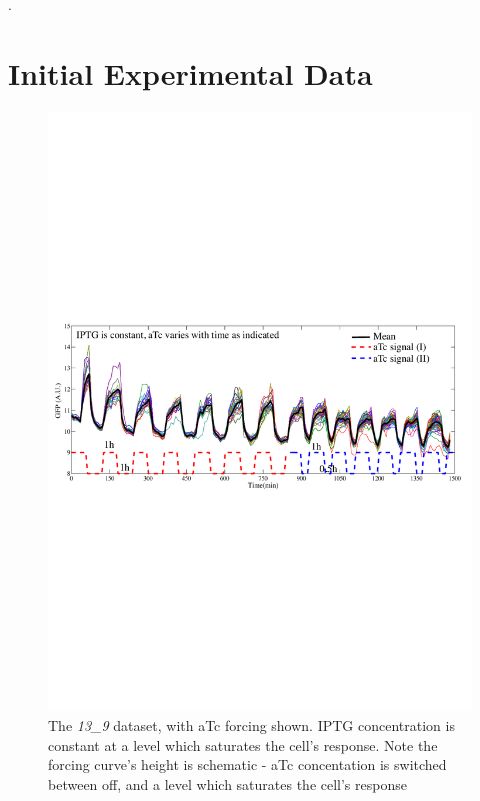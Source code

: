 \documentclass[10pt,journal]{./IEEE_latex_class/IEEEtran}
\begin{document}
.





\clearpage
\onecolumn

\appendices
\renewcommand\thefigure{\thesection.\arabic{figure}}  


\section{Initial Experimental Data}
\label{Initial Experimental Data}
\setcounter{figure}{0}    

\begin{figure}[h]
\centering
\includegraphics[trim = 0 310 0 300 , scale = 0.5, clip = true]{13_9}
\caption{The \textit{13\_9} dataset, with aTc forcing shown. IPTG concentration is constant at a level which saturates the cell's response. Note the forcing curve's height is schematic - aTc concentation is switched between off, and a level which saturates the cell's response}
\label{}
\end{figure}
\end{document}
